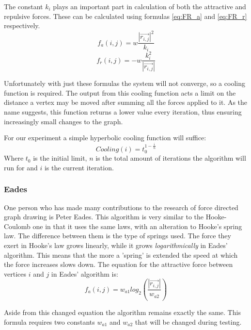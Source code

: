 \documentclass[a4paper,12pt]{article}
\begin{document}
    The constant $k_{i}$ plays an important part in calculation of both the attractive and repulsive forces.
    These can be calculated using formulas \ref{eq:FR_a} and \ref{eq:FR_r} respectively.
    \begin{equation}\label{eq:FR_a}
      f_{a}(i,j) = w \frac{|\vec{r_{i,j}}|^2}{k_{i}}
    \end{equation}
    \begin{equation}\label{eq:FR_r}
      f_{r}(i,j) = - w \frac{k_{i}^2}{|\vec{r_{i,j}}|}
    \end{equation}

    Unfortunately with just these formulas the system will not converge, so a cooling function is required. The output from this cooling function acts a limit on the distance a vertex may be moved after summing all the forces applied to it. As the name suggests, this function returns a lower value every iteration, thus ensuring increasingly small changes to the graph.
    
    For our experiment a simple hyperbolic cooling function will suffice:
    \begin{equation}
	    Cooling(i) = t_{0}^{1 - \frac{i}{n}}
    \end{equation}
    Where $t_{0}$ is the initial limit, $n$ is the total amount of iterations the algorithm will run for and $i$ is the current iteration.

    \subsubsection{Eades}
    One person who has made many contributions to the research of force directed graph drawing is Peter Eades.
    This algorithm is very similar to the Hooke-Coulomb one in that it uses the same laws, with an alteration to Hooke's spring law.
    The difference between them is the type of springs used.
    The force they exert in Hooke's law grows linearly, while it grows \emph{logarithmically} in Eades' algorithm.
	This means that the more a 'spring' is extended the speed at which the force increases slows down.
    The equation for the attractive force between vertices $i$ and $j$ in Eades' algorithm is:
    \begin{equation}\label{eq:Eades_a}
      f_a(i,j) = w_{a1} log_{2}(\frac{|\vec{r_{i,j}}|}{w_{a2}})
    \end{equation}

    Aside from this changed equation the algorithm remains exactly the same.
    This formula requires two constants $w_{a1}$ and $w_{a2}$ that will be changed during testing. \cite{eades1984heuristic}
\end{document}
